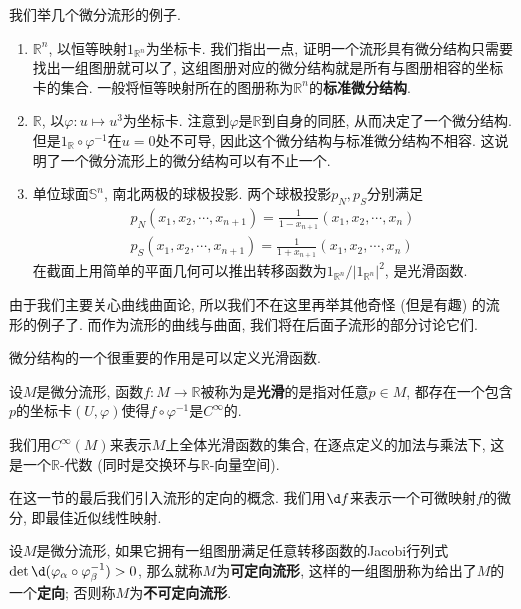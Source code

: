 \begin{eg}我们举几个微分流形的例子.
    \begin{enumerate}[(1)]
        \item $\mathbb{R}^n$, 以恒等映射$1_{\mathbb{R}^n}$为坐标卡.
        我们指出一点, 证明一个流形具有微分结构只需要找出一组图册就可以了, 这组图册对应的微分结构就是所有与图册相容的坐标卡的集合.
        一般将恒等映射所在的图册称为$\mathbb{R}^n$的\textbf{标准微分结构}.
        \item $\mathbb{R}$, 以$\varphi:u\mapsto u^3$为坐标卡.
        注意到$\varphi$是$\mathbb{R}$到自身的同胚, 从而决定了一个微分结构.
        但是$1_{\mathbb{R}}\circ\varphi^{-1}$在$u=0$处不可导, 因此这个微分结构与标准微分结构不相容.
        这说明了一个微分流形上的微分结构可以有不止一个.
        \item 单位球面$\mathbb{S}^n$, 南北两极的球极投影. 两个球极投影$p_N,p_S$分别满足
        \begin{gather*}
            p_N(x_1,x_2,\cdots,x_{n+1})=\frac{1}{1-x_{n+1}}(x_1,x_2,\cdots,x_n)\\
            p_S(x_1,x_2,\cdots,x_{n+1})=\frac{1}{1+x_{n+1}}(x_1,x_2,\cdots,x_n)
        \end{gather*}
        在截面上用简单的平面几何可以推出转移函数为$1_{\mathbb{R}^n}/|1_{\mathbb{R}^n}|^2$, 是光滑函数.
    \end{enumerate}
\end{eg}
由于我们主要关心曲线曲面论, 所以我们不在这里再举其他奇怪 (但是有趣) 的流形的例子了.
而作为流形的曲线与曲面, 我们将在后面子流形的部分讨论它们.

微分结构的一个很重要的作用是可以定义光滑函数.
\begin{defn}\label{smooth function 1}
    设$M$是微分流形, 函数$f:M\to\mathbb{R}$被称为是\textbf{光滑}的是指对任意$p\in M$, 都存在一个包含$p$的坐标卡$(U,\varphi)$使得$f\circ\varphi^{-1}$是$C^\infty$的.
\end{defn}

\begin{sym}
    我们用$C^\infty(M)$来表示$M$上全体光滑函数的集合, 在逐点定义的加法与乘法下, 这是一个$\mathbb{R}$-代数 (同时是交换环与$\mathbb{R}$-向量空间).
\end{sym}

在这一节的最后我们引入流形的定向的概念.
我们用$\d f$来表示一个可微映射$f$的微分, 即最佳近似线性映射.
\begin{defn}
    设$M$是微分流形, 如果它拥有一组图册满足任意转移函数的Jacobi行列式$\det\d(\varphi_\alpha\circ\varphi_\beta^{-1})>0$, 那么就称$M$为\textbf{可定向流形}, 这样的一组图册称为给出了$M$的一个\textbf{定向}; 否则称$M$为\textbf{不可定向流形}.
\end{defn}

